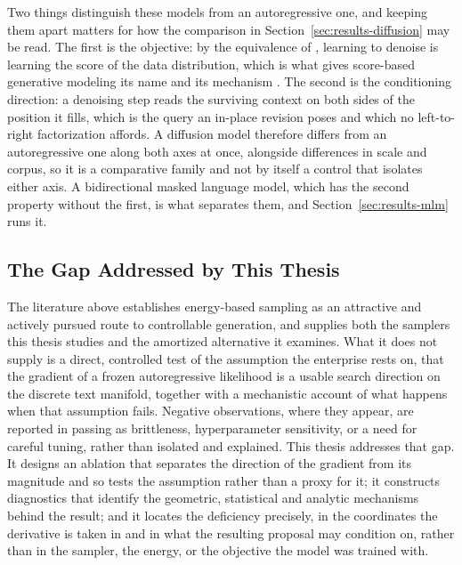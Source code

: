 Two things distinguish these models from an autoregressive one, and keeping them apart matters for how the comparison in Section~\ref{sec:results-diffusion} may be read. The first is the objective: by the equivalence of \citet{vincent2011connection}, learning to denoise is learning the score of the data distribution, which is what gives score-based generative modeling its name and its mechanism \citep{song2019generative, ho2020denoising}. The second is the conditioning direction: a denoising step reads the surviving context on both sides of the position it fills, which is the query an in-place revision poses and which no left-to-right factorization affords. A diffusion model therefore differs from an autoregressive one along both axes at once, alongside differences in scale and corpus, so it is a comparative family and not by itself a control that isolates either axis. A bidirectional masked language model, which has the second property without the first, is what separates them, and Section~\ref{sec:results-mlm} runs it.

\subsection{The Gap Addressed by This Thesis}
\label{sec:rel-gap}

The literature above establishes energy-based sampling as an attractive and actively pursued route to controllable generation, and supplies both the samplers this thesis studies and the amortized alternative it examines. What it does not supply is a direct, controlled test of the assumption the enterprise rests on, that the gradient of a frozen autoregressive likelihood is a usable search direction on the discrete text manifold, together with a mechanistic account of what happens when that assumption fails. Negative observations, where they appear, are reported in passing as brittleness, hyperparameter sensitivity, or a need for careful tuning, rather than isolated and explained. This thesis addresses that gap. It designs an ablation that separates the direction of the gradient from its magnitude and so tests the assumption rather than a proxy for it; it constructs diagnostics that identify the geometric, statistical and analytic mechanisms behind the result; and it locates the deficiency precisely, in the coordinates the derivative is taken in and in what the resulting proposal may condition on, rather than in the sampler, the energy, or the objective the model was trained with.
